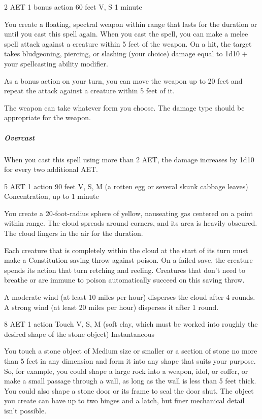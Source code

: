 {2 AET}
{1 bonus action}
{60 feet}
{V, S}
{1 minute}

You create a floating, spectral weapon within range that lasts for the duration or until you cast this spell again. When you cast the spell, you can make a melee spell attack against a creature within 5 feet of the weapon. On a hit, the target takes bludgeoning, piercing, or slashing (your choice) damage equal to 1d10 + your spellcasting ability modifier.

As a bonus action on your turn, you can move the weapon up to 20 feet and repeat the attack against a creature within 5 feet of it.

The weapon can take whatever form you choose. The damage type should be appropriate for the weapon.

\subparagraph*{Overcast} When you cast this spell using more than 2 AET, the damage increases by 1d10 for every two additional AET.


{5 AET}
{1 action}
{90 feet}
{V, S, M (a rotten egg or several skunk cabbage leaves)}
{Concentration, up to 1 minute}

You create a 20-foot-radius sphere of yellow, nauseating gas centered on a point within range. The cloud spreads around corners, and its area is heavily obscured. The cloud lingers in the air for the duration.

Each creature that is completely within the cloud at the start of its turn must make a Constitution saving throw against poison. On a failed save, the creature spends its action that turn retching and reeling. Creatures that don't need to breathe or are immune to poison automatically succeed on this saving throw.

A moderate wind (at least 10 miles per hour) disperses the cloud after 4 rounds. A strong wind (at least 20 miles per hour) disperses it after 1 round.


{8 AET}
{1 action}
{Touch}
{V, S, M (soft clay, which must be worked into roughly the desired shape of the stone object)}
{Instantaneous}

You touch a stone object of Medium size or smaller or a section of stone no more than 5 feet in any dimension and form it into any shape that suits your purpose. So, for example, you could shape a large rock into a weapon, idol, or coffer, or make a small passage through a wall, as long as the wall is less than 5 feet thick. You could also shape a stone door or its frame to seal the door shut. The object you create can have up to two hinges and a latch, but finer mechanical detail isn't possible.


